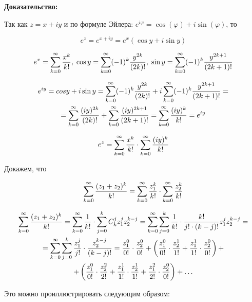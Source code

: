 \textbf{Доказательство:}

Так как $z = x + iy$ и по формуле Эйлера: $e^{i \varphi} = \cos(\varphi) + i \sin(\varphi)$, то 

$$
e^z = e^{x + iy} = e^x \left( \cos y + i \sin y \right)
$$

$$
e^x = \sum^{\infty}_{k = 0} \frac{x^k}{k!}, \; \cos y = \sum^{\infty}_{k = 0} (-1)^k \frac{y^{2k}}{(2k)!}, \; \sin y = \sum^{\infty}_{k = 0} (-1)^k \frac{y^{2k + 1}}{(2k + 1)!}
$$

\begin{multline*}
e^{iy} = cos y + i \sin y = \sum^{\infty}_{k = 0} (-1)^k \frac{y^{2k}}{(2k)!} + i \sum^{\infty}_{k = 0} (-1)^k \frac{y^{2k + 1}}{(2k + 1)!} =  \\ = \sum^{\infty}_{k = 0} \frac{(iy)^{2k}}{(2k)!} + \sum^{\infty}_{k = 0} \frac{(iy)^{2k + 1}}{(2k + 1)!} = \sum^{\infty}_{k = 0} \frac{(iy)^{k}}{k!} = e^{iy}
\end{multline*}

$$
e^z = \sum^{\infty}_{k = 0} \frac{x^k}{k!} \cdot \sum^{\infty}_{k = 0} \frac{(iy)^{k}}{k!}
$$

Докажем, что

$$
\sum^{\infty}_{k = 0} \frac{(z_1 + z_2)^k}{k!} = \sum^{\infty}_{k = 0} \frac{z_1^k}{k!} \cdot \sum^{\infty}_{k = 0} \frac{z_2^k}{k!}
$$

\begin{multline*}
\sum^{\infty}_{k = 0} \frac{(z_1 + z_2)^k}{k!} = \sum^{\infty}_{k = 0} \frac{1}{k!} \cdot \sum_{j = 0}^k C_k^j z_1^j z_2^{k - j} = \sum^{\infty}_{k = 0}  \sum_{j = 0}^k \frac{1}{k!} \cdot \frac{k!}{j! \cdot (k - j)!} z_1^j z_2^{k - j} = \\ = \sum^{\infty}_{k = 0}  \sum_{j = 0}^k \frac{z_1^j}{j!} \cdot \frac{z_2^{k - j}}{(k - j)!} = \frac{z_1^0}{0!} \cdot \frac{z_2^0}{0!} + \left(\frac{z_1^0}{0!} \cdot \frac{z_2^1}{1!} + \frac{z_1^1}{1!} \cdot \frac{z_2^0}{0!} \right) + \\ + \left( \frac{z_1^0}{0!} \cdot \frac{z_2^2}{2!} + \frac{z_1^1}{1!} \cdot \frac{z_2^1}{1!} + \frac{z_1^2}{2!} \cdot \frac{z_2^0}{0!} \right) + \ldots
\end{multline*}

Это можно проиллюстрировать следующим образом:

\begin{table}[h!]
\centering
{}
\end{table}

